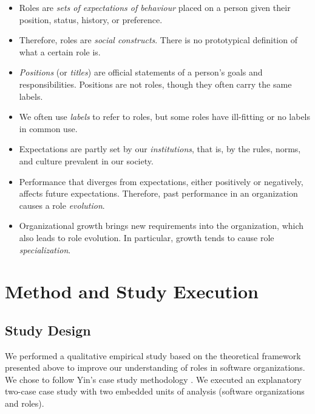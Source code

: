 \documentclass[10pt, conference, compsocconf]{IEEEtran}
\begin{document}
\begin{itemize}
\item Roles are \emph{sets of expectations of behaviour} placed on a person given their position, status, history, or preference.

\item Therefore, roles are \emph{social constructs}. There is no prototypical definition of what a certain role is.

\item \emph{Positions} (or \emph{titles}) are official statements of a person's goals and responsibilities. Positions are not roles, though they often carry the same labels.

\item We often use \emph{labels} to refer to roles, but some roles have ill-fitting or no labels in common use.

\item Expectations are partly set by our \emph{institutions}, that is, by the rules, norms, and culture prevalent in our society.

\item Performance that diverges from expectations, either positively or negatively, affects future expectations. Therefore, past performance in an organization causes a role \emph{evolution}.

\item Organizational growth brings new requirements into the organization, which also leads to role evolution. In particular, growth tends to cause role \emph{specialization}.
\end{itemize}




\section{Method and Study Execution}

\subsection{Study Design}

We performed a qualitative empirical study based on the theoretical framework presented above to improve our understanding of roles in software organizations. We chose to follow Yin's case study methodology \cite{Yin2003}. We executed an explanatory two-case case study with two embedded units of analysis (software organizations and roles).
\end{document}
